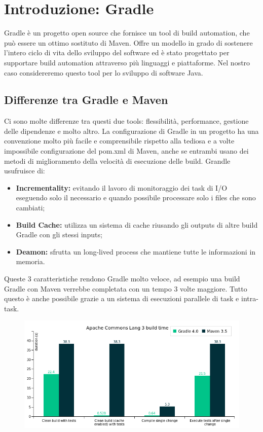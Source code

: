 
\section{Introduzione: Gradle} %
Gradle è un progetto open source che fornisce un tool di build automation, che può essere un ottimo sostituto di Maven. Offre un modello in grado di sostenere l'intero ciclo di vita dello sviluppo del software ed è stato progettato per supportare build automation attraverso più linguaggi e piattaforme. Nel nostro caso considereremo questo tool per lo sviluppo di software Java.

\subsection{Differenze tra Gradle e Maven} %
Ci sono molte differenze tra questi due tools: flessibilità, performance, gestione delle dipendenze e molto altro. La configurazione di Gradle in un progetto ha una convenzione molto più facile e comprensibile rispetto alla tediosa e a volte impossibile configurazione del pom.xml di Maven, anche se entrambi usano dei metodi di miglioramento della velocità di esecuzione delle build. Grandle usufruisce di:
\begin{itemize}
    \item \textbf{Incrementality:} evitando il lavoro di monitoraggio dei task di I/O eseguendo solo il necessario e quando possibile processare solo i files che sono cambiati;
    \item \textbf{Build Cache:} utilizza un sistema di cache riusando gli outputs di altre build Gradle con gli stessi inputs;
    \item \textbf{Deamon:} sfrutta un long-lived process che mantiene tutte le informazioni in memoria.
\end{itemize}
Queste 3 caratteristiche rendono Gradle molto veloce, ad esempio una build Gradle con Maven verrebbe completata con un tempo 3 volte maggiore. Tutto questo è anche possibile grazie a un sistema di esecuzioni parallele di task e intra-task.
\begin{figure}[H]
\includegraphics[scale=0.70]{introduction/performance.png}
\end{figure} 


